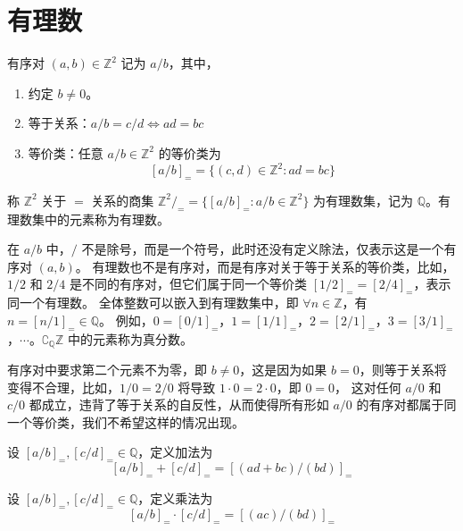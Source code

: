 \section{有理数}
\begin{definition}
    有序对 $(a,b)\in\mathbb{Z}^2$ 记为 $a/b$，其中，
    \begin{enumerate}
        \item 约定 $b\neq 0$。
        \item 等于关系：$a/b=c/d \iff ad=bc$
        \item 等价类：任意 $a/b\in\mathbb{Z}^2$ 的等价类为
        \[
            [a/b]_{=}=\{(c,d)\in\mathbb{Z}^2:ad=bc\}
        \]
    \end{enumerate}
    称 $\mathbb{Z}^2$ 关于 $=$ 关系的商集 $\mathbb{Z}^2/_{=}= \{[a/b]_{=} : a/b \in \mathbb{Z}^2\}$ 为有理数集，记为 $\mathbb{Q}$。有理数集中的元素称为有理数。
\end{definition}

\begin{note}
    在 $a/b$ 中，$/$ 不是除号，而是一个符号，此时还没有定义除法，仅表示这是一个有序对 $(a,b)$。
    有理数也不是有序对，而是有序对关于等于关系的等价类，比如，$1/2$ 和 $2/4$ 是不同的有序对，但它们属于同一个等价类 $[1/2]_{=}=[2/4]_{=}$，表示同一个有理数。
    全体整数可以嵌入到有理数集中，即 $\forall n\in\mathbb{Z}$，有 $n = [n/1]_{=}\in\mathbb{Q}$。
    例如，$0 = [0/1]_{=}$，$1 = [1/1]_{=}$，$2 = [2/1]_{=}$，$3 = [3/1]_{=}$，$\cdots$。$\complement_{\mathbb{Q}}\mathbb{Z}$ 中的元素称为真分数。
\end{note}

\begin{note}
    有序对中要求第二个元素不为零，即 $b\neq 0$，这是因为如果 $b=0$，则等于关系将变得不合理，比如，$1/0=2/0$ 将导致 $1\cdot0=2\cdot0$，即 $0=0$，
    这对任何 $a/0$ 和 $c/0$ 都成立，违背了等于关系的自反性，从而使得所有形如 $a/0$ 的有序对都属于同一个等价类，我们不希望这样的情况出现。
\end{note}
\vspace{1em}

\begin{definition}
    设 $[a/b]_{=},[c/d]_{=}\in\mathbb{Q}$，定义加法为
    \[
        [a/b]_{=} + [c/d]_{=} = [(ad+bc)/(bd)]_{=}
    \]
\end{definition}

\begin{definition}
    设 $[a/b]_{=},[c/d]_{=}\in\mathbb{Q}$，定义乘法为
    \[
        [a/b]_{=} \cdot [c/d]_{=} = [(ac)/(bd)]_{=}
    \]
\end{definition}

